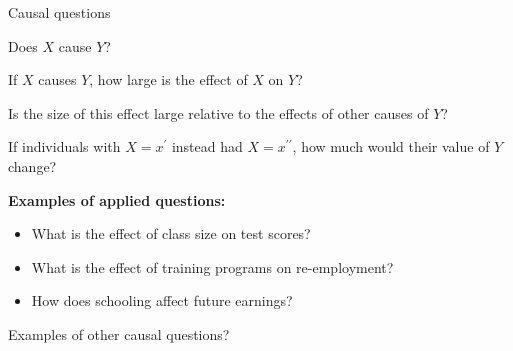\documentclass[handout, 8pt]{beamer}
\begin{document}
\begin{frame}{Causal questions}


\begin{figure}
\end{figure}

\vspace{2ex}
Does $X$ cause $Y$?

\pause
\vspace{2ex}
If $X$ causes $Y$, how large is the effect of $X$ on $Y$?

\pause
\vspace{2ex}
Is the size of this effect large relative to the effects of other causes of $Y$?

\pause
\vspace{2ex}
If individuals with $X = x^\prime$ instead had $X = x^{\prime\prime}$, how much would their value of $Y$ change?

\pause
\vspace{2ex}
\textbf{Examples of applied questions:}
\begin{itemize}
    \item What is the effect of class size on test scores?
    \item What is the effect of training programs on re-employment?
    \item How does schooling affect future earnings?
\end{itemize}
Examples of other causal questions?

\end{frame}
\end{document}
